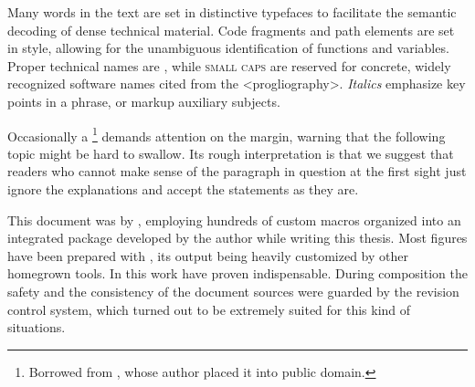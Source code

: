 Many words in the text are set in distinctive typefaces to facilitate
the semantic decoding of dense technical material.  Code fragments
and path elements are set in  style, allowing for
the unambiguous identification of functions and variables.  Proper
technical names are , while \textsc{small caps} are
reserved for concrete, widely recognized software names cited from
the \Link<progliography>.  \emph{Italics} emphasize key points in
a phrase, or markup auxiliary subjects.

\Warning
Occasionally a \footnote{Borrowed from
\cite{TeXBook}, whose author placed it into public domain.} demands
attention on the margin, warning that the following topic might be
hard to swallow.  Its rough interpretation is that we suggest that
readers who cannot make sense of the paragraph in question at the
first sight just ignore the explanations and accept the statements
as they are.

This document was  by ,
employing hundreds of custom macros organized into an integrated
package developed by the author while writing this thesis.  Most
figures have been prepared with , its 
output being heavily customized by other homegrown tools.  In this
work \cite{PostScript1,PostScript2} have proven indispensable.
During composition the safety and the consistency of the document
sources were guarded by the  revision control system,
which turned out to be extremely suited for this kind of situations.

